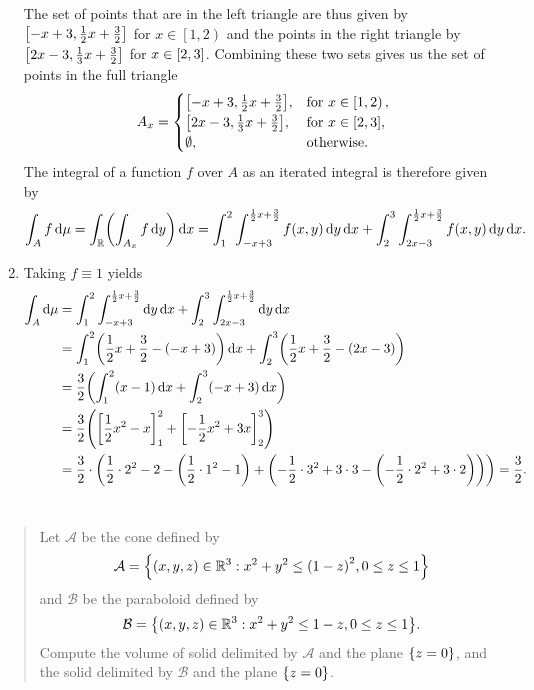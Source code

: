 \documentclass{exercise}
\begin{document}
\begin{enumerate}
		The set of points that are in the left triangle are thus given by \(\brackets*{-x + 3, \frac{1}{2}x + \frac{3}{2}}\) for \(x \in \left[1, 2\right)\) and the points in the right triangle by \(\brackets*{2x - 3, \frac{1}{3}x + \frac{3}{2}}\) for \(x \in \brackets*{2, 3}\).
		Combining these two sets gives us the set of points in the full triangle
		\[
			A_x = \begin{cases}
				\brackets*{-x + 3, \frac{1}{2}x + \frac{3}{2}}, & \text{for }x \in \left[1, 2\right),\\
				\brackets*{2x - 3, \frac{1}{3}x + \frac{3}{2}}, & \text{for }x \in \brackets*{2, 3},\\
				\emptyset, & \text{otherwise}.
			\end{cases}
		\]
		The integral of a function \(f\) over \(A\) as an iterated integral is therefore given by
		\[
			\int_A f\d\mu = \int_\R \parentheses*{\int_{A_x}f\d y}\d x = \int_1^2 \int_{-x + 3}^{\frac{1}{2}x + \frac{3}{2}}f\parentheses*{x, y}\d y\d x + \int_2^3 \int_{2x - 3}^{\frac{1}{2}x + \frac{3}{2}}f\parentheses*{x, y}\d y\d x.
		\]
		\item Taking \(f \equiv 1\) yields
		\begin{align*}
			\int_A \d\mu &= \int_1^2 \int_{-x + 3}^{\frac{1}{2}x + \frac{3}{2}}\d y\d x + \int_2^3 \int_{2x - 3}^{\frac{1}{2}x + \frac{3}{2}}\d y\d x\\
			&= \int_1^2 \parentheses*{\frac{1}{2}x + \frac{3}{2} - \parentheses*{-x + 3}}\d x + \int_2^3 \parentheses*{\frac{1}{2}x + \frac{3}{2} - \parentheses*{2x - 3}}\\
			&= \frac{3}{2}\parentheses*{\int_1^2 \parentheses*{x - 1}\d x + \int_2^3 \parentheses*{-x + 3}\d x}\\
			&= \frac{3}{2}\parentheses*{\brackets*{\frac{1}{2}x^2 - x}_1^2 + \brackets*{-\frac{1}{2}x^2 + 3x}_2^3}\\
			&= \frac{3}{2} \cdot \parentheses*{\frac{1}{2} \cdot 2^2 - 2 - \parentheses*{\frac{1}{2} \cdot 1^2 - 1} + \parentheses*{-\frac{1}{2} \cdot 3^2 + 3 \cdot 3 - \parentheses*{-\frac{1}{2} \cdot 2^2 + 3 \cdot 2}}} = \frac{3}{2}.
		\end{align*}
	\end{enumerate}


	\section{}

	\begin{quote}
		Let \(\mathcal{A}\) be the cone defined by
		\[
			\mathcal{A} = \braces*{\parentheses*{x, y, z} \in \R^3 : x^2 + y^2 \le \parentheses*{1 - z}^2, 0 \le z \le 1}
		\]
		and \(\mathcal{B}\) be the paraboloid defined by
		\[
			\mathcal{B} = \braces*{\parentheses*{x, y, z} \in \R^3 : x^2 + y^2 \le 1 - z, 0 \le z \le 1}.
		\]
		Compute the volume of solid delimited by \(\mathcal{A}\) and the plane \(\braces*{z = 0}\), and the solid delimited by \(\mathcal{B}\) and the plane \(\braces*{z = 0}\).
	\end{quote}
\end{document}
